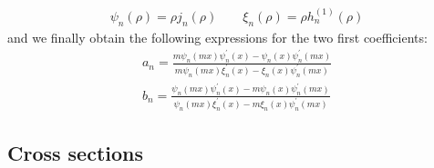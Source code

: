 \documentclass{article}
\numberwithin{equation}{section}
\begin{document}
\begin{align}
\psi_{n}(\rho)=\rho j_{n}(\rho) \qquad \xi_{n}(\rho)=\rho h^{(1)}_{n}(\rho)
\end{align}
and we finally obtain the following expressions for the two first coefficients:
\begin{equation}\label{eq:an_bn}
\begin{aligned}
a_{n} = \frac{m\psi_{n}(mx)\psi^{'}_{n}(x)-\psi_{n}(x)\psi^{'}_{n}(mx)}{m\psi_{n}(mx)\xi^{'}_{n}(x)-\xi_{n}(x)\psi^{'}_{n}(mx)}\\
b_{n} = \frac{\psi_{n}(mx)\psi^{'}_{n}(x)-m\psi_{n}(x)\psi^{'}_{n}(mx)}{\psi_{n}(mx)\xi^{'}_{n}(x)-m\xi_{n}(x)\psi^{'}_{n}(mx)}
\end{aligned}
\end{equation}

\subsection{Cross sections}
\end{document}
